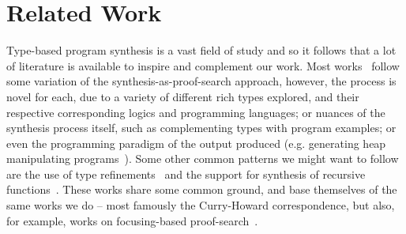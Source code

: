 \documentclass{llncs}
\begin{document}

\section{Related Work}


Type-based program synthesis is a vast field of study and so it
follows that a lot of literature is available to inspire and
complement our work. Most works~\cite{} follow some variation of the
synthesis-as-proof-search approach, however, the process is novel for
each, due to a variety of different rich types explored, and their
respective corresponding logics and programming languages; or nuances
of the synthesis process itself, such as complementing types with
program examples; or even the programming paradigm of the output
produced (e.g. generating heap manipulating
programs~\cite{DBLP:journals/pacmpl/PolikarpovaS19}).  Some other
common patterns we might want to follow are the use of type
refinements~\cite{} and the support for synthesis of recursive
functions~\cite{}.  These works share some common ground, and base
themselves of the same works we do -- most famously the Curry-Howard
correspondence, but also, for example, works on focusing-based
proof-search~\cite{focusing}.
\end{document}
